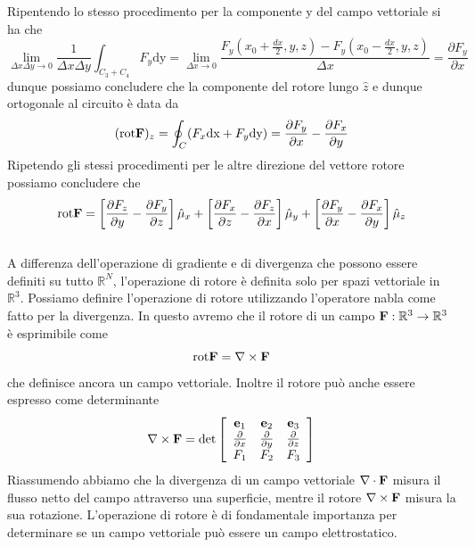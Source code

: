 Ripentendo lo stesso procedimento per la componente y del campo vettoriale si ha che 
\begin{equation*}
	\lim_{\Delta x \Delta y \to 0} \frac{1}{\Delta x \Delta y} \int_{C_3+C_4}F_y \text{dy} = \lim_{\Delta x \to 0}\frac{F_y(x_0+\frac{dx}{2},y,z) - F_y(x_0-\frac{dx}{2},y,z)}{\Delta x} = \frac{\partial F_y}{\partial x}
\end{equation*}
dunque possiamo concludere che la componente del rotore lungo $\hat{z}$ e dunque ortogonale al circuito \`e data da 
\begin{equation}
	(\text{rot}\bold{F})_z = \oint_{C} (F_x\text{dx}+F_y\text{dy}) = \frac{\partial F_y}{\partial x}-\frac{\partial F_x}{\partial y} 
\end{equation}
 Ripetendo gli stessi procedimenti per le altre direzione del vettore rotore possiamo concludere che 
 \begin{equation*}
 	\text{rot}\bold{F} = \left [ \frac{\partial F_z}{\partial y} - \frac{\partial F_y}{\partial z} \right] \hat{\mu}_{x} + \left [ \frac{\partial F_x}{\partial z} - \frac{\partial F_z}{\partial x}\right] \hat{\mu}_{y} + \left[ \frac{\partial F_y}{\partial x}-\frac{\partial F_x}{\partial y}\right]\hat{\mu}_{z}
 \end{equation*}
\\
\noindent A differenza dell'operazione di gradiente e di divergenza che possono essere definiti su tutto $\mathbb{R}^N$, l'operazione di rotore \`e definita solo per spazi vettoriale in $\mathbb{R}^3$. Possiamo definire l'operazione di rotore utilizzando l'operatore nabla come fatto per la divergenza. In questo avremo che il rotore di un campo $\bold{F} : \mathbb{R}^3 \to \mathbb{R}^3$ \`e esprimibile come 
\begin{equation*}
	\text{rot}\bold{F} = \nabla \times \bold{F}
\end{equation*}  
che definisce ancora un campo vettoriale. Inoltre il rotore pu\`o anche essere espresso come determinante 
\begin{equation*}
	\nabla \times \bold{F} = \text{det}\left [\begin{array}{ccc}
		\bold{e}_1 & \bold{e}_2 & \bold{e}_3 \\
		\frac{\partial}{\partial x} & \frac{\partial }{\partial y} & \frac{\partial}{\partial z}\\
		F_1 & F_2 & F_3
	\end{array}\right ]
\end{equation*}
\noindent Riassumendo abbiamo che la divergenza di un campo vettoriale $\nabla \cdot \bold{F}$ misura il flusso netto del campo attraverso una superficie, mentre il rotore $\nabla \times \bold{F}$ misura la sua rotazione. L'operazione di rotore \`e di fondamentale importanza per determinare se un campo vettoriale pu\`o essere un campo elettrostatico.

